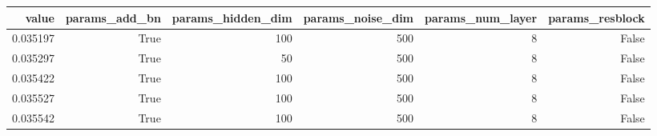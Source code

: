\begin{tabular}{rrrrrr}
\toprule
value & params_add_bn & params_hidden_dim & params_noise_dim & params_num_layer & params_resblock \\
\midrule
0.035197 & True & 100 & 500 & 8 & False \\
0.035297 & True & 50 & 500 & 8 & False \\
0.035422 & True & 100 & 500 & 8 & False \\
0.035527 & True & 100 & 500 & 8 & False \\
0.035542 & True & 100 & 500 & 8 & False \\
\bottomrule
\end{tabular}
